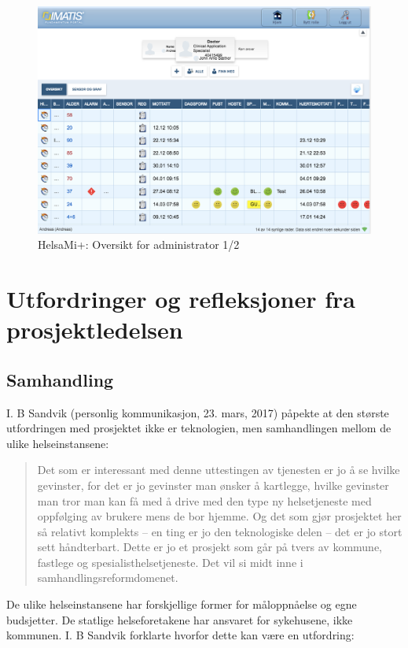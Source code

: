 \begin{figure}
\includegraphics[width=1.0\textwidth,center]{fig/helsami/admin_oversikt}
\caption{HelsaMi+: Oversikt for administrator 1/2}
\label{fig:helsami_admin1}
\end{figure}

\section{Utfordringer og refleksjoner fra prosjektledelsen}

\subsection{Samhandling}
I. B Sandvik (personlig kommunikasjon, 23. mars, 2017) påpekte at den største utfordringen med prosjektet ikke er teknologien, men samhandlingen mellom de ulike
helseinstansene:

\blockquote{Det som er interessant med denne uttestingen av tjenesten er jo å se hvilke gevinster, for det er jo gevinster man ønsker å kartlegge, hvilke gevinster man tror
    man kan få med å drive med den type ny helsetjeneste med oppfølging av brukere mens de bor hjemme. Og det som gjør prosjektet her så relativt komplekts -- en ting
    er jo den teknologiske delen -- det er jo stort sett håndterbart. Dette er jo et prosjekt som går på tvers av kommune, fastlege og spesialisthelsetjeneste. Det vil
si midt inne i samhandlingsreformdomenet.}

De ulike helseinstansene har forskjellige former for måloppnåelse og egne budsjetter. De statlige helseforetakene har ansvaret for sykehusene,
ikke kommunen. I. B Sandvik forklarte hvorfor dette kan være en utfordring:


